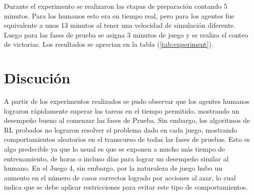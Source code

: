 Durante el experimento se realizaron las etapas de preparación contando 5 minutos. Para los humanos esto era en tiempo real, pero para los agentes fue equivalente a unos 13 minutos al tener una velocidad de simulación diferente. Luego para las fases de prueba se asigna 3 minutos de juego y se realiza el conteo de victorias. Los resultados se aprecian en la tabla (\ref{tab:experiment}).
 
\begin{table}[ht!]
    \centering
    \caption{Resultado del experimento en la fase de Prueba. Total de juegos completados correctamente durante 3 minutos.}
    \label{tab:experiment}
\end{table}
 
\section{Discución}
 
A partir de los experimentos realizados se pudo observar que los agentes humanos lograron rápidamente superar las tareas en el tiempo permitido, mostrando un desempeño bueno al comenzar las fases de Prueba. Sin embargo, los algoritmos de RL probados no lograron resolver el problema dado en cada juego, mostrando comportamientos aleatorios en el transcurso de todas las fases de pruebas. Esto es algo predecible ya que lo usual es que se exponen a mucho más tiempo de entrenamiento, de horas o incluso días para lograr un desempeño similar al humano. En el Juego 4, sin embargo, por la naturaleza de juego hubo un aumento en el número de casos correctos logrado por acciones al azar, lo cual indica que se debe aplicar restricciones para evitar este tipo de comportamientos.
 
 

